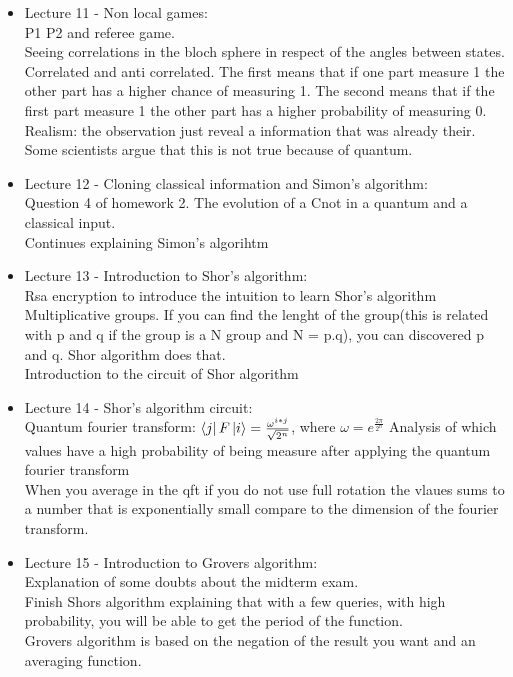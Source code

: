 \documentclass{article}
\begin{document}
\begin{itemize}
    \item {Lecture 11 - Non local games:}\\
    P1 P2 and referee game. \\
    Seeing correlations in the bloch sphere in respect of the angles between states. \\
    Correlated and anti correlated. The first means that if one part measure 1 the other part has a higher chance of measuring 1. The second means that if the first part measure 1 the other part has a higher probability of measuring 0.\\    
    Realism: the observation just reveal a information that was already their. Some scientists argue that this is not true because of quantum.\\

    \item {Lecture 12 - Cloning classical information and Simon's algorithm:}\\
    Question 4 of homework 2. The evolution of a Cnot in a quantum and a classical input. \\
    Continues explaining Simon's algorihtm\\

    \item {Lecture 13 - Introduction to Shor's algorithm:}\\
    Rsa encryption to introduce the intuition to learn Shor's algorithm\\
    Multiplicative groups. If you can find the lenght of the group(this is related with p and q if the group is a N group and N = p.q), you can discovered p and q. Shor algorithm does that. \\
    Introduction to the circuit of Shor algorithm\\

    \item {Lecture 14 - Shor's algorithm circuit:}\\
    Quantum fourier transform: $\bra{j} F \ket{i} = \frac{\omega^{i*j}}{\sqrt{2^{n}}}$, where $\omega = e^{\frac{2\pi}{2^{n}}}$ 
    Analysis of which values have a high probability of being measure after applying the quantum fourier transform\\
    When you average in the qft if you do not use full rotation the vlaues sums to a number that is exponentially small compare to the dimension of the fourier transform.\\

    \item {Lecture 15 - Introduction to Grovers algorithm:}\\
    Explanation of some doubts about the midterm exam. \\
    Finish Shors algorithm explaining that with a few queries, with high probability, you will be able to get the period of the function. \\
    Grovers algorithm is based on the negation of the result you want and an averaging function.\\


\end{itemize}
\end{document}
